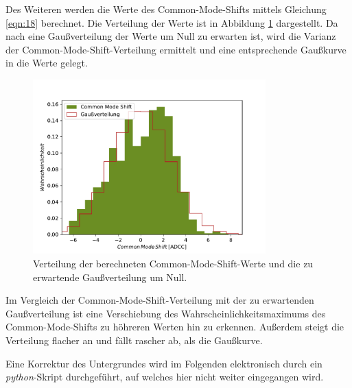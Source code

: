 Des Weiteren werden die Werte des Common-Mode-Shifts mittels Gleichung \eqref{eqn:18} berechnet. Die Verteilung der Werte ist in Abbildung \ref{fig:CommonModeShift} dargestellt. Da nach \cite{anleitung} eine Gaußverteilung der Werte um Null zu erwarten ist, wird die Varianz der Common-Mode-Shift-Verteilung ermittelt und eine entsprechende Gaußkurve in die Werte gelegt.
\begin{figure}
  \centering
  \includegraphics[width=0.8\textwidth]{plots/CommonModeShift.pdf}
  \caption{Verteilung der berechneten Common-Mode-Shift-Werte und die zu erwartende Gaußverteilung um Null.}
  \label{fig:CommonModeShift}
\end{figure}
\FloatBarrier
Im Vergleich der Common-Mode-Shift-Verteilung mit der zu erwartenden Gaußverteilung ist eine Verschiebung des Wahrscheinlichkeitsmaximums des Common-Mode-Shifts zu höhreren Werten hin zu erkennen. Außerdem steigt die Verteilung flacher an und fällt rascher ab, als die Gaußkurve.

Eine Korrektur des Untergrundes wird im Folgenden elektronisch durch ein \textit{python}-Skript durchgeführt, auf welches hier nicht weiter eingegangen wird.

